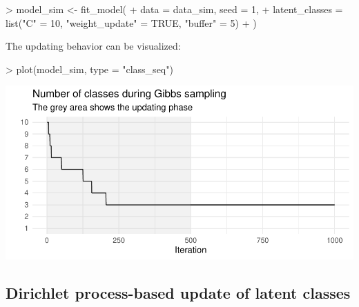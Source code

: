 \documentclass[article,shortnames]{jss}
\begin{document}
\begin{Schunk}
\begin{Sinput}
> model_sim <- fit_model(
+    data = data_sim, seed = 1,
+    latent_classes = list("C" = 10, "weight_update" = TRUE, "buffer" = 5)
+  )
\end{Sinput}
\end{Schunk}

The updating behavior can be visualized:

\begin{Schunk}
\begin{Sinput}
> plot(model_sim, type = "class_seq")
\end{Sinput}
\end{Schunk}
\includegraphics{rprobitb_oelschlaeger_bauer-model-sim-class-seq}

\subsection{Dirichlet process-based update of latent classes} \label{subsec:dp_update}
\end{document}
